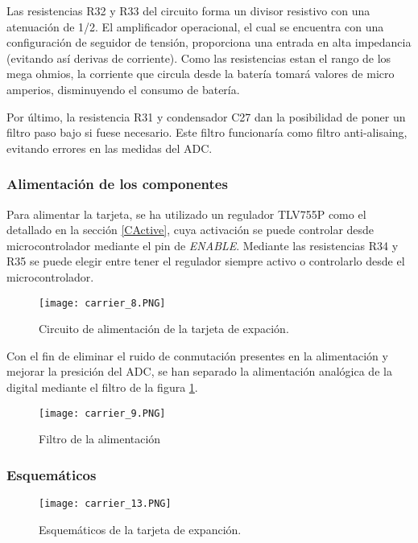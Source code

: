 Las resistencias R32 y R33 del circuito forma un divisor resistivo con una atenuación de 1/2. El amplificador operacional, el cual se encuentra con una configuración de seguidor de tensión, proporciona una entrada en alta impedancia (evitando así derivas de corriente). Como las resistencias estan el rango de los mega ohmios, la corriente que circula desde la batería tomará valores de micro amperios, disminuyendo el consumo de batería.

Por último, la resistencia R31 y condensador C27 dan la posibilidad de poner un filtro paso bajo si fuese necesario. Este filtro funcionaría como filtro anti-alisaing, evitando errores en las medidas del ADC.

		\subsubsection{Alimentación de los componentes}
		
Para alimentar la tarjeta, se ha utilizado un regulador TLV755P como el detallado en la sección \ref{CActive}, cuya activación se puede controlar desde microcontrolador mediante el pin de \textit{ENABLE}. Mediante las resistencias R34 y R35 se puede elegir entre tener el regulador siempre activo o controlarlo desde el microcontrolador.  

\begin{figure}[hbt!]
	\centering
	\texttt{[image: carrier\_8.PNG]}
	\caption{Circuito de alimentación de la tarjeta de expación.}
\end{figure}
		
Con el fin de eliminar el ruido de conmutación presentes en la alimentación y mejorar la presición del ADC, se han separado la alimentación analógica de la digital mediante el filtro de la figura \ref{fig:car9}.

\begin{figure}[hbt!]
	\centering
	\texttt{[image: carrier\_9.PNG]}
	\caption{Filtro de la alimentación}
	\label{fig:car9}
\end{figure}
\pagebreak

		\subsubsection{Esquemáticos}
\begin{figure}[hbt!]
	\centering
	\texttt{[image: carrier\_13.PNG]}
	\caption{Esquemáticos de la tarjeta de expanción.}
	\label{fig:car13}
\end{figure}		
\pagebreak
